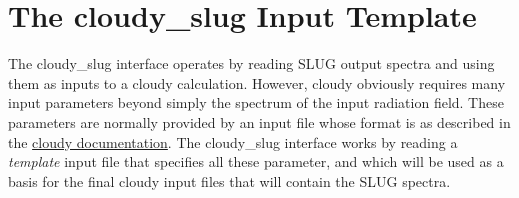 \documentclass[letterpaper,10pt,english]{sphinxmanual}
\begin{document}
\section{The cloudy\_slug Input Template}
\label{cloudy:the-cloudy-slug-input-template}\label{cloudy:ssec-cloudy-template}
The cloudy\_slug interface operates by reading SLUG output spectra and
using them as inputs to a cloudy calculation. However, cloudy
obviously requires many input parameters beyond simply the spectrum of
the input radiation field. These parameters are normally provided by
an input file whose format is as described in the \href{http://nublado.org}{cloudy documentation}. The cloudy\_slug interface works by reading a
\emph{template} input file that specifies all these parameter, and which
will be used as a basis for the final cloudy input files that will
contain the SLUG spectra.
\end{document}

